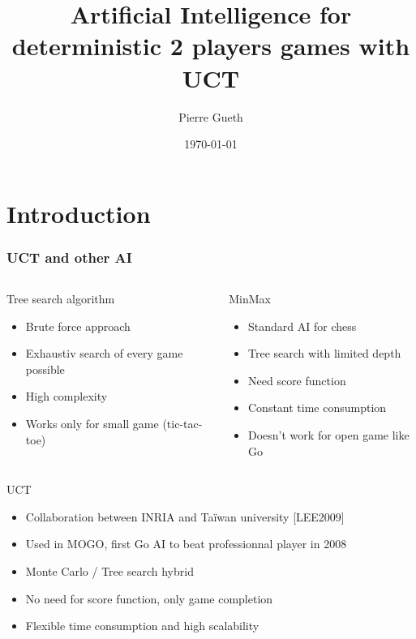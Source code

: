 \documentclass{beamer}
\title{Artificial Intelligence for deterministic 2 players games with UCT}
\author{Pierre Gueth}
\institute{}
\date{\today}
\begin{document}
\maketitle


\section{Introduction}

\begin{frame}
\frametitle{UCT and other AI}

\begin{columns}
\begin{column}{.45\linewidth}
\begin{alertblock}{Tree search algorithm}
\begin{itemize}
\item Brute force approach
\item Exhaustiv search of every game possible
\item High complexity
\item Works only for small game (tic-tac-toe)
\end{itemize}
\end{alertblock} 
\end{column}
\begin{column}{.5\linewidth}
\begin{alertblock}{MinMax}
\begin{itemize}
\item Standard AI for chess
\item Tree search with limited depth
\item Need score function
\item Constant time consumption
\item Doesn't work for open game like Go
\end{itemize}
\end{alertblock}
\end{column}
\end{columns}


\begin{exampleblock}{UCT}
\begin{itemize}
\item Collaboration between INRIA and Taïwan university [LEE2009]
\item Used in MOGO, first Go AI to beat professionnal player in 2008
\item Monte Carlo / Tree search hybrid
\item \alert<2>{No need for score function}, only game completion
\item \alert<2>{Flexible time consumption and high scalability}
\end{itemize}
\end{exampleblock}
\end{frame}
\end{document}
